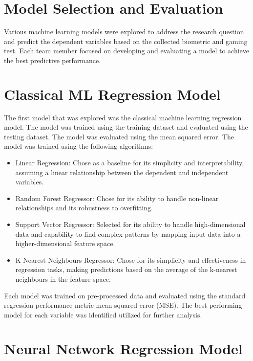 \section{Model Selection and Evaluation}
Various machine learning models were explored to address the research question and predict the dependent variables based on the collected biometric and gaming test. Each team member
focused on developing and evaluating a model to achieve the best predictive performance. 


\section{Classical ML Regression Model}
The first model that was explored was the classical machine learning regression model. The model was trained using the training dataset and evaluated using the testing dataset. 
The model was evaluated using the mean squared error. The model was trained using the following algorithms:

\begin{itemize}
    \item Linear Regression: Chose as a baseline for its simplicity and interpretability, assuming a linear relationship between the dependent and independent variables.
    \item Random Forest Regressor: Chose for its ability to handle non-linear relationships and its robustness to overfitting. 
    \item Support Vector Regressor: Selected for its ability to handle high-dimensional data and capability to find complex patterns by mapping input data into a higher-dimensional feature space.
    \item K-Nearest Neighbours Regressor: Chose for its simplicity and effectiveness in regression tasks, making predictions based on the average of the k-nearest neighbours in the feature space.
\end{itemize}

Each model was trained on pre-processed data and evaluated using the standard regression performance metric mean squared error (MSE). The best performing model for each variable was 
identified utilized for further analysis.




\section{Neural Network Regression Model}



